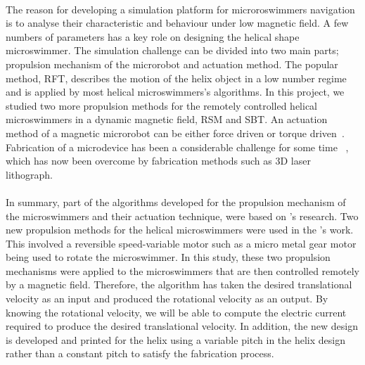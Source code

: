 \documentclass[12pt,a4paper,titlepage]{report}
\begin{document}
\paragraph{}
The reason for developing a simulation platform for microroswimmers navigation is to analyse
 their characteristic and behaviour under low magnetic field. A few numbers of parameters 
has a key role on designing the helical shape microswimmer. The simulation
challenge can be divided into two main parts; propulsion mechanism of the microrobot and actuation method. The
popular method, \ac*{RFT}, describes the motion of the helix object in a low number regime and
is applied by most helical microswimmers\rq{}s algorithms\citep{qiu2014noncytotoxic}. In this
project, we studied two more propulsion methods for the remotely controlled helical microswimmers
 in a dynamic magnetic field, \ac*{RSM} and \ac*{SBT}. An actuation method of a magnetic  microrobot 
can be either force driven or
torque driven~\citep{qiunanohelices}. Fabrication of a microdevice has been a considerable challenge 
for some time ~\citep{qiunanohelices}, which has now been
overcome by fabrication methods such as 3D laser lithograph.



\paragraph{}
In summary, part of the algorithms developed for the propulsion mechanism of the microswimmers
and their actuation technique, were based on \citeauthor{mahoney2011velocity}\rq{}s research. Two new 
propulsion methods for the helical microswimmers were used in the \citeauthor{rodenborn2013propulsion}\rq{}s
work. This involved a reversible speed-variable motor such as a micro metal gear motor being used to rotate 
the microswimmer. In this study, these two propulsion mechanisms were applied to the microswimmers that 
are then controlled remotely by a magnetic field. Therefore, the algorithm has taken the desired translational
velocity as an input and produced the rotational velocity as an output. By knowing the rotational velocity, 
we will be able to compute the electric current required to produce the desired translational velocity. 
In addition, the new design is developed and printed for the helix using a variable pitch
in the helix design rather than a constant pitch to satisfy 
 the fabrication process. 



\end{document}
